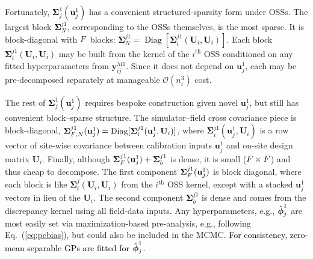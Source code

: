 \documentclass[12pt]{article}
\newcommand{\blu}[1]{\textcolor{black}{#1}} %
\newcommand{\blunew}[1]{\textcolor{black}{#1}} %
\DeclareMathOperator{\Diag}{Diag}
\newcommand{\bm}[1]{\mbox{\boldmath $#1$}}
\begin{document}
Fortunately, \blunew{$\mathbf{\Sigma}_{j}^1(\mathbf{u}^1_j)$} has a convenient
structured-sparsity form under OSSs. 
The largest block  \blunew{$\mathbf{\Sigma}^{j1}_{N}$}, corresponding to the
OSSs themselves, is the most sparse.  It is block-diagonal with $\blunew{F}$
blocks: \blunew{$\mathbf{\Sigma}^{j1}_{N}=\Diag[\mathbf{\Sigma}^{j1}_i(\mathbf{U}_i,
\mathbf{U}_i)]$}.  Each block \blunew{$\mathbf{\Sigma}^{j1}_i(\mathbf{U}_i,
\mathbf{U}_i)$} may be built from the kernel of the $i^\mathrm{th}$ OSS 
conditioned on any fitted hyperparameters from $\mathbf{y}_{ij}^{M1}$.  Since it
does not depend on $\mathbf{u}^1_j$, each may be pre-decomposed separately
at manageable $\mathcal{O}(n_i^3)$ cost.  

The rest of \blunew{$\mathbf{\Sigma}_j^1(\mathbf{u}^1_j)$} requires bespoke construction given
novel $\mathbf{u}^1_j$, but still has convenient block--sparse structure.  The
simulator--field cross covariance piece is block-diagonal, \blunew{$\mathbf{\Sigma}^{j1}_{\blunew{F},
N}(\mathbf{u}^1_j)=\Diag[\mathbf{\Sigma}^{j1}_i(\mathbf{u}^1_j, \mathbf{U}_i)]$},
where \blunew{$\mathbf{\Sigma}^{j1}_i(\mathbf{u}^1_j, \mathbf{U}_i)$} is a row vector of
site-wise covariance between calibration inputs $\mathbf{u}^1_j$ and on-site
design matrix $\mathbf{U}_i$. Finally, although \blunew{
$\mathbf{\Sigma}^{j1}_{\blunew{F}}(\mathbf{u}^1_j) + \mathbf{\Sigma}^{j1}_{b}$} is dense, it is small
($\blunew{F} \times \blunew{F}$) and thus cheap to decompose.  The first component
\blunew{$\mathbf{\Sigma}^{j1}_{\blunew{F}}(\mathbf{u}^1_j)$} is block diagonal, where each block is
like \blunew{$\mathbf{\Sigma}^j_i(\mathbf{U}_i,
\mathbf{U}_i)$} from the $i^\mathrm{th}$ OSS kernel, except with a  stacked
$\mathbf{u}^1_j$ vectors in lieu of the $\mathbf{U}_i$.  The second component
\blunew{$\mathbf{\Sigma}^{j1}_{b}$} is dense and comes from the discrepancy kernel using all
field-data inputs.  Any hyperparameters, e.g., $\hat{\bm{\phi}}_{j}^1$ are most
easily set via maximization-based pre-analysis, e.g., following
Eq.~(\ref{eq:pcbias}), but could also be included in the MCMC.
 \blu{For consistency, zero-mean separable GPs are fitted for $\hat{\bm{\phi}}_{j}^1$.}
\end{document}
